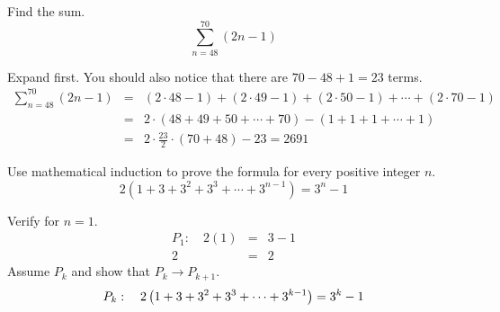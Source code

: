 \documentclass[12pt,addpoints, answers, fleqn]{exam}
\begin{document}
\begin{questions}
\question Find the sum.
\[
\sum\limits_{n = 48}^{70} \left( 2n - 1 \right)
\]
\begin{solution} Expand first. You should also notice that there are $70-48+1=23$ terms.
\begin{eqnarray*}
\sum\limits_{n = 48}^{70} \left( 2n - 1 \right) &=& \left(2 \cdot 48 - 1 \right) + \left(2 \cdot 49 - 1 \right) + \left(2 \cdot 50 - 1 \right) + \cdots + \left(2 \cdot 70 - 1 \right)\\
&=& 2 \cdot \left( 48 +  49 +  50 + \cdots +  70 \right) - \left(1 + 1 + 1 + \cdots + 1 \right)\\
&=& 2 \cdot \frac{23}{2} \cdot \left(70+48 \right) - 23= \boxed{2691}
\end{eqnarray*}
\end{solution}
\question Use mathematical induction to prove the formula for every positive integer $n$.
\[
2\left(1 + 3 + 3^2 + 3^3 + \cdots +  3^{n - 1} \right) = 3^n - 1
\]
\begin{solution} Verify for $n=1$.
\begin{eqnarray*}
P_1: \quad 2\left(1\right) &=& 3 - 1\\
                         2 &=& 2
\end{eqnarray*}
Assume $P_k$ and show that $P_k \rightarrow P_{k+1}$.
\[
P_k: \quad 2\left(1 + 3 + 3^2 + 3^3 + \cdots +  3^{k - 1} \right) = 3^k - 1\\
\]

\end{solution}
\end{questions}
\end{document}
